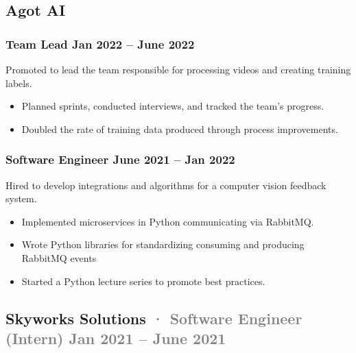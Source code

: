 \documentclass[10pt]{article} %
\providecommand{\tightlist}{%
  \setlength{\itemsep}{0pt}\setlength{\parskip}{0pt}}
\renewcommand{\emph}[1]{%
  \textcolor{gray}{#1}%
}
\begin{document}
\begin{paracol}{2}
\hypertarget{agot-ai}{%
\subsection{Agot AI}\label{agot-ai}}

\vspace{-5pt}

\hypertarget{team-lead-jan-2022-june-2022}{%
\subsubsection{\texorpdfstring{\small Team Lead \hfill Jan 2022 -- June
2022}{Team Lead Jan 2022 -- June 2022}}\label{team-lead-jan-2022-june-2022}}

Promoted to lead the team responsible for processing videos and creating
training labels.

\begin{itemize}
\tightlist
\item
  Planned sprints, conducted interviews, and tracked the team's
  progress.
\item
  Doubled the rate of training data produced through process
  improvements.
\end{itemize}

\hypertarget{software-engineer-june-2021-jan-2022}{%
\subsubsection{\texorpdfstring{\small Software Engineer \hfill June 2021
-- Jan
2022}{Software Engineer June 2021 -- Jan 2022}}\label{software-engineer-june-2021-jan-2022}}

Hired to develop integrations and algorithms for a computer vision
feedback system.

\begin{itemize}
\tightlist
\item
  Implemented microservices in Python communicating via RabbitMQ.
\item
  Wrote Python libraries for standardizing consuming and producing
  RabbitMQ events
\item
  Started a Python lecture series to promote best practices.
\end{itemize}

\hypertarget{skyworks-solutions-software-engineer-intern-jan-2021-june-2021}{%
\subsection{\texorpdfstring{Skyworks Solutions \emph{· \small Software
Engineer (Intern) \hfill Jan 2021 -- June
2021}}{Skyworks Solutions · Software Engineer (Intern) Jan 2021 -- June 2021}}\label{skyworks-solutions-software-engineer-intern-jan-2021-june-2021}}


\end{paracol}
\end{document}
